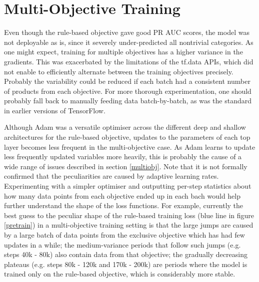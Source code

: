 \section{Multi-Objective Training}

Even though the rule-based objective gave good PR AUC scores, the model was not deployable as is, since it severely under-predicted all nontrivial categories.
As one might expect, training for multiple objectives has a higher variance in the gradients.
This was exacerbated by the limitations of the tf.data APIs, which did not enable to efficiently alternate between the training objectives precisely.
Probably the variability could be reduced if each batch had a consistent number of products from each objective.
For more thorough experimentation, one should probably fall back to manually feeding data batch-by-batch, as was the standard in earlier versions of TensorFlow.

Although Adam was a versatile optimiser across the different deep and shallow architectures for the rule-based objective, updates to the parameters of each top layer becomes less frequent in the multi-objective case.
As Adam learns to update less frequently updated variables more heavily, this is probably the cause of a wide range of issues described in section \ref{multiobj}.
Note that it is not formally confirmed that the peculiarities are caused by adaptive learning rates.
Experimenting with a simpler optimiser and outputting per-step statistics about how many data points from each objective ended up in each bach would help further understand the shape of the loss functions.
For example, currently the best guess to the peculiar shape of the rule-based training loss (blue line in figure \ref{pretrain}) in a multi-objective training setting is that the large jumps are caused by a large batch of data points from the exclusive objective which has had few updates in a while; the medium-variance periods that follow such jumps (e.g. steps 40k - 80k) also contain data from that objective; the gradually decreasing plateaus (e.g. steps 80k - 120k and 170k - 200k) are periods where the model is trained only on the rule-based objective, which is considerably more stable.

